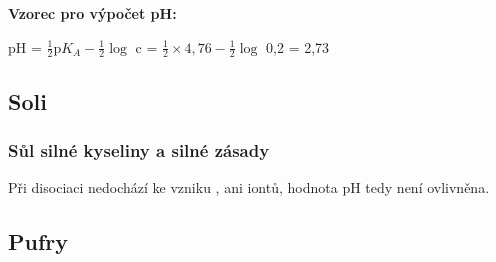 \textbf{Vzorec pro výpočet pH:}

pH = $\frac{1}{2}\textrm{p}K_A-\frac{1}{2}\log$ c = $\frac{1}{2}\times4,76 -\frac{1}{2}\log$ 0,2 = 2,73

\subsection{Soli}
\subsubsection{Sůl silné kyseliny a silné zásady}


Při disociaci nedochází ke vzniku , ani  iontů, hodnota pH tedy není ovlivněna.

\subsection{Pufry}


\clearpage